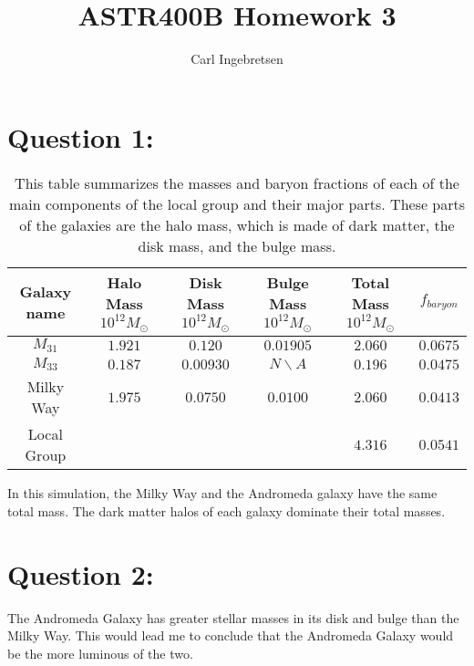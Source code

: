 \documentclass[
  journal=Notes,
  manuscript=Homework,
  year=2022,
  volume=1,
]{dgl-journal}
\title{ASTR400B Homework 3}
\author{Carl Ingebretsen}
\begin{document}

\section{Question 1:}

\begin{table}[]
    \centering
    \begin{tabular}{||c|c|c|c|c|c||}
        Galaxy name & Halo Mass $10^{12} M_\odot$ & Disk Mass $10^{12} M_\odot$ & Bulge Mass $10^{12} M_\odot$ & Total Mass $10^{12} M_\odot$ & $f_{baryon}$\\
        \hline
        $M_{31}$ & $1.921$ & $0.120$ & $0.01905$ & $2.060$ & $0.0675$ \\
        \hline
        $M_{33}$ & $0.187$ & $0.00930$ & $N\backslash A$ & $0.196$ & $0.0475$ \\
        \hline
        Milky Way & $1.975$ & $0.0750$ & $0.0100$ & $2.060$ & $0.0413$ \\
        \hline
        Local Group & & & & $4.316$ & $0.0541$
      \end{tabular}
    \caption{This table summarizes the masses and baryon fractions of each of the main components of the local group and their major parts. These parts of the galaxies are the halo mass, which is made of dark matter, the disk mass, and the bulge mass. }
    \label{mass_table}
\end{table}

In this simulation, the Milky Way and the Andromeda galaxy have the same total mass. The dark matter halos of each galaxy dominate their total masses.

\section{Question 2:}
The Andromeda Galaxy has greater stellar masses in its disk and bulge than the Milky Way. This would lead me to conclude that the Andromeda Galaxy would be the more luminous of the two.
\end{document}
